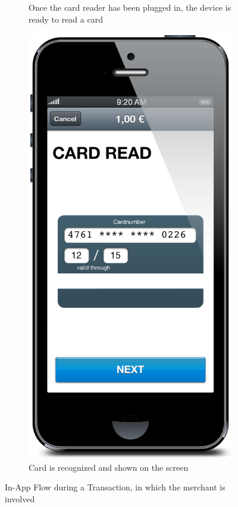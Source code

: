 \documentclass[a4paper, oneside]{csthesis}
\begin{document}
\begin{figure}
\begin{subfigure}[b]{0.22\textwidth}
                \caption{Once the card reader has been plugged in, the device is ready to read a card}
                \label{fig:flow3}
        \end{subfigure}
        \begin{subfigure}[b]{0.22\textwidth}
                \centering
                \includegraphics[width=\textwidth]{figures/flow4.png}
                \caption{Card is recognized and shown on the screen}
                \label{fig:flow4}
        \end{subfigure}
        \caption{In-App Flow during a Transaction, in which the merchant is involved}\label{fig:flow-merchant}
\end{figure}
\end{document}
